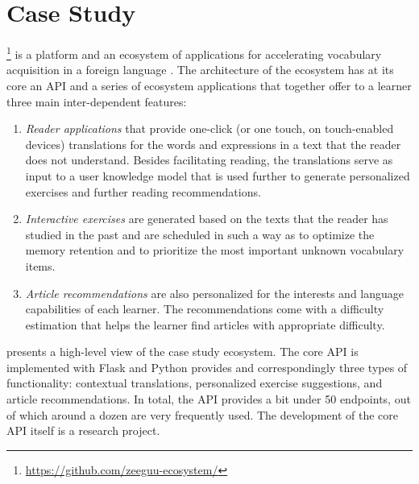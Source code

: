 \section{Case Study}

\label{sec:api}
\label{sec:case}

  \zee\footnote{\url{https://github.com/zeeguu-ecosystem/}} is a platform and an ecosystem of applications for accelerating vocabulary acquisition in a foreign language \cite{Lungu16}. 
%
  The architecture of the ecosystem has at its core an API and a series of ecosystem applications that together offer to a learner three main inter-dependent features:

  \begin{enumerate}

    \item \textit{Reader applications} that provide one-click (or one touch, on touch-enabled devices) translations for the words and expressions in a text that the reader does not understand. Besides facilitating reading, the translations serve as input to a user knowledge model that is used further to generate personalized exercises and further reading recommendations.

    \item \textit{Interactive exercises} are generated based on the texts that the reader has studied in the past and are scheduled in such a way as to optimize the memory retention and to prioritize the most important unknown vocabulary items.

    \item \textit{Article recommendations} are also personalized for the interests and language capabilities of each learner. The recommendations come with a difficulty estimation that helps the learner find articles with appropriate difficulty.

  \end{enumerate}

   presents a high-level view of the case study ecosystem.  The core API is implemented with Flask and Python provides and correspondingly three types of functionality: contextual translations, personalized exercise suggestions, and article recommendations. In total, the API provides a bit under 50 endpoints, out of which around a dozen are very frequently used. The development of the core API itself is a research project. 


